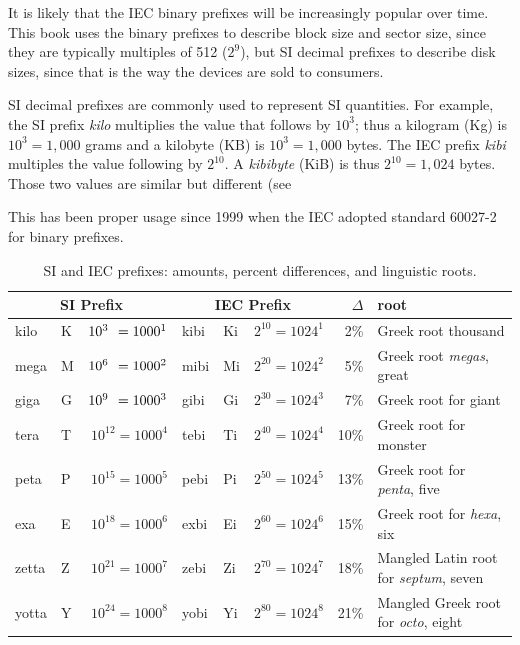 It is likely that the IEC binary prefixes will be increasingly popular
over time. This book uses the binary prefixes to describe block size
and sector size, since they are typically multiples of 512 ($2^9$),
but SI decimal prefixes to describe disk sizes, since that is the way
the devices are sold to consumers.

SI decimal prefixes are commonly used to represent SI
quantities. For example, the SI prefix \emph{kilo} multiplies the value that follows by
$10^3$; thus a kilogram (Kg) is
$10^3=1,000$ grams and a kilobyte (KB) is
$10^3=1,000$ bytes. The IEC prefix \emph{kibi} multiples the value following by $2^{10}$. A \emph{kibibyte}
(KiB) is thus $2^{10}=1,024$ bytes. Those two values are similar but
different (see 

This has been proper usage
since 1999 when the IEC adopted standard 60027-2 for binary prefixes.



\newcommand{\WZ}{{\color{white}0}}

\begin{table}
\begin{tabular}{||llr|llr|rl|}
\multicolumn{3}{c}{SI Prefix} & \multicolumn{3}{c}{IEC Prefix} & $\Delta$ & root \\ 
\hline
kilo  & K & $10^{3\WZ} = 1000^1 $ & kibi & Ki & $2^{10} = 1024^1 $& 2\% & Greek root {thousand} \\
\hline
mega  & M & $10^{6\WZ} = 1000^2 $ & mibi & Mi & $2^{20} = 1024^2 $& 5\% & Greek root \emph{megas}, {great}\\
\hline
giga  & G & $10^{9\WZ} = 1000^3 $ & gibi & Gi & $2^{30} = 1024^3 $& 7\% & Greek root for {giant}\\
\hline
tera  & T & $10^{12} = 1000^4$ & tebi & Ti & $2^{40} = 1024^4 $& 10\% & Greek root for {monster}\\
\hline
peta  & P & $10^{15} = 1000^5$ & pebi & Pi & $2^{50} = 1024^5 $& 13\% & Greek root for \emph{penta}, {five}\\
\hline
exa   & E & $10^{18} = 1000^6$ & exbi & Ei & $2^{60} = 1024^6 $& 15\% & Greek root for \emph{hexa}, {six}\\
\hline
zetta & Z & $10^{21} = 1000^7$ & zebi & Zi & $2^{70} = 1024^7 $& 18\% & Mangled Latin root for \emph{septum}, {seven}\\
\hline
yotta & Y & $10^{24} = 1000^8$ & yobi & Yi & $2^{80} = 1024^8 $& 21\% & Mangled Greek root for \emph{octo}, {eight}\\
\hline
\hline
\end{tabular}
\caption{SI and IEC prefixes: amounts, percent differences, and
  linguistic roots.}\label{si-iec-differences}
\end{table}

